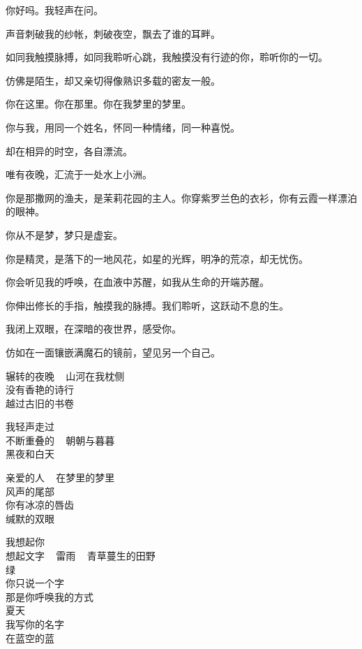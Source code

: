 		你好吗。我轻声在问。\par
		声音刺破我的纱帐，刺破夜空，飘去了谁的耳畔。

		如同我触摸脉搏，如同我聆听心跳，我触摸没有行迹的你，聆听你的一切。\par
		仿佛是陌生，却又亲切得像熟识多载的密友一般。

		你在这里。你在那里。你在我梦里的梦里。\par
		你与我，用同一个姓名，怀同一种情绪，同一种喜悦。\par
		却在相异的时空，各自漂流。\par
		唯有夜晚，汇流于一处水上小洲。

		你是那撒网的渔夫，是茉莉花园的主人。你穿紫罗兰色的衣衫，你有云霞一样漂泊的眼神。\par
		你从不是梦，梦只是虚妄。\par
		你是精灵，是落下的一地风花，如星的光辉，明净的荒凉，却无忧伤。\par
		你会听见我的呼唤，在血液中苏醒，如我从生命的开端苏醒。\par
		你伸出修长的手指，触摸我的脉搏。我们聆听，这跃动不息的生。

		我闭上双眼，在深暗的夜世界，感受你。\par
		仿如在一面镶嵌满魔石的镜前，望见另一个自己。

	\endwriting


	\longpoem{}{}{}

		辗转的夜晚 ~ 山河在我枕侧 \\
		没有香艳的诗行 \\
		越过古旧的书卷

		我轻声走过 \\
		不断重叠的 ~ 朝朝与暮暮 \\
		黑夜和白天

		亲爱的人 ~ 在梦里的梦里 \\
		风声的尾部 \\
		你有冰凉的唇齿 \\
		缄默的双眼

		我想起你 \\
		想起文字 ~ 雷雨 ~ 青草蔓生的田野 \\
		绿 \\
		你只说一个字 \\
		那是你呼唤我的方式 \\
		夏天 \\
		我写你的名字 \\
		在蓝空的蓝

	\endlongpoem
	\endwriting


